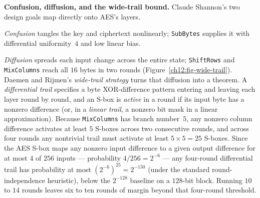 \begin{whybox}
\textbf{Confusion, diffusion, and the wide-trail bound.} Claude Shannon's two
design goals map directly onto AES's layers.

\emph{Confusion} tangles the key and ciphertext nonlinearly; \texttt{SubBytes}
supplies it with differential uniformity~$4$ and low linear bias.

\emph{Diffusion} spreads each input change across the entire state;
\texttt{ShiftRows} and \texttt{MixColumns} reach all $16$ bytes in two rounds
(Figure~\ref{ch12:fig-wide-trail}). Daemen and Rijmen's \emph{wide-trail strategy}
turns that diffusion into a theorem. A \emph{differential trail} specifies a byte
XOR-difference pattern entering and leaving each layer round by round, and an
S-box is \emph{active} in a round if its input byte has a nonzero difference (or,
in a \emph{linear trail}, a nonzero bit mask in a linear approximation). Because
\texttt{MixColumns} has branch number~$5$, any nonzero column difference activates
at least $5$ S-boxes across two consecutive rounds, and across four rounds any
nontrivial trail must activate at least $5 \times 5 = 25$ S-boxes. Since the AES
S-box maps any nonzero input difference to a given output difference for at most
$4$ of $256$ inputs --- probability $4/256 = 2^{-6}$ --- any four-round
differential trail has probability at most $(2^{-6})^{25} = 2^{-150}$ (under the
standard round-independence heuristic), below the $2^{-128}$ baseline on a
$128$-bit block. Running $10$ to $14$ rounds leaves six to ten rounds of margin
beyond that four-round threshold.
\end{whybox}

